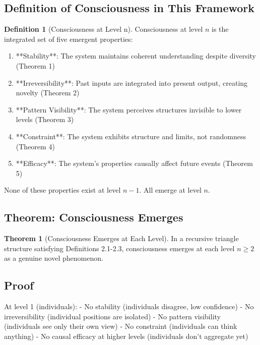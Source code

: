 \documentclass[12pt,a4paper]{article}
\theoremstyle{definition}
\newtheorem{definition}{Definition}[section]
\newtheorem{theorem}{Theorem}[section]
\begin{document}
{\subsection{Definition of Consciousness in This Framework}

\begin{definition}[Consciousness at Level n]
Consciousness at level $n$ is the integrated set of five emergent properties:
\begin{enumerate}
    \item **Stability**: The system maintains coherent understanding despite diversity (Theorem 1)
    \item **Irreversibility**: Past inputs are integrated into present output, creating novelty (Theorem 2)
    \item **Pattern Visibility**: The system perceives structures invisible to lower levels (Theorem 3)
    \item **Constraint**: The system exhibits structure and limits, not randomness (Theorem 4)
    \item **Efficacy**: The system's properties causally affect future events (Theorem 5)
\end{enumerate}

None of these properties exist at level $n-1$. All emerge at level $n$.
\end{definition}

\subsection{Theorem: Consciousness Emerges}

\begin{theorem}[Consciousness Emerges at Each Level]
In a recursive triangle structure satisfying Definitions 2.1-2.3, consciousness emerges at each level $n \geq 2$ as a genuine novel phenomenon.
\end{theorem}

\subsection{Proof}

At level 1 (individuals):
- No stability (individuals disagree, low confidence)
- No irreversibility (individual positions are isolated)
- No pattern visibility (individuals see only their own view)
- No constraint (individuals can think anything)
- No causal efficacy at higher levels (individuals don't aggregate yet)

}
\end{document}
